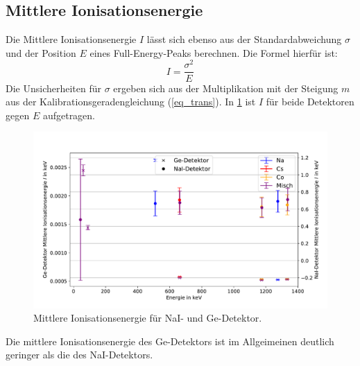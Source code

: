 \documentclass[
	a4paper,
	12pt,
	pagesize,
	ngerman
]{scrartcl}
\begin{document}
\subsection{Mittlere Ionisationsenergie}
Die Mittlere Ionisationsenergie $I$ lässt sich ebenso aus der Standardabweichung $\sigma$ und der Position $E$ eines Full-Energy-Peaks berechnen.
Die Formel hierfür ist:
\begin{equation}
	I = \frac{\sigma^2}{E}
\end{equation}
Die Unsicherheiten für $\sigma$ ergeben sich aus der Multiplikation mit der Steigung $m$ aus der Kalibrationsgeradengleichung (\ref{eq_trans}).
In \cref{fg_ionisation} ist $I$ für beide Detektoren gegen $E$ aufgetragen.


	\begin{figure}[H]
			\includegraphics[width= 1 \linewidth]{img/ion}
			\caption{
			Mittlere Ionisationsenergie für NaI- und Ge-Detektor.
			}
			\label{fg_ionisation}
	\end{figure}


Die mittlere Ionisationsenergie des Ge-Detektors ist im Allgeimeinen deutlich geringer als die des NaI-Detektors. %
\end{document}
